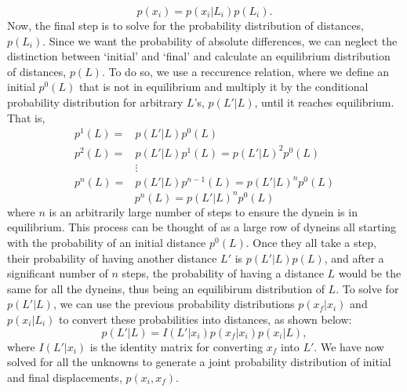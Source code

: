 \begin{equation}
	p(x_i)=p(x_i|L_i)p(L_i).
\end{equation}
Now, the final step is to solve for the probability distribution of distances, $p(L_i)$. Since we want the probability of absolute differences, we can neglect the distinction between `initial' and `final' and calculate an equilibrium distribution of distances, $p(L)$. To do so, we use a reccurence relation, where we define an initial $p^0(L)$ that is not in equilibrium and multiply it by the conditional probability distribution for arbitrary $L$'s, $p(L'|L)$, until it reaches equilibrium. That is,
\begin{align*}
	p^1(L)= & p(L'|L)p^0(L) \\
	p^2(L)= & p(L'|L)p^1(L)=p(L'|L)^2p^0(L)\\
	&\vdots \\
	p^n(L)= & p(L'|L)p^{n-1}(L)=p(L'|L)^np^0(L) 
\end{align*}
\begin{equation}
	p^n(L)=p(L'|L)^np^0(L) 	
\end{equation}
where $n$ is an arbitrarily large number of steps to ensure the dynein is in equilibrium. This process can be thought of as a large row of dyneins all starting with the probability of an initial distance $p^0(L)$. Once they all take a step, their probability of having another distance $L'$ is $p(L'|L)p(L)$, and after a significant number of $n$ steps, the probability of having a distance $L$ would be the same for all the dyneins, thus being an equilibirum distribution of $L$. To solve for $p(L'|L)$, we can use the previous probability distributions $p(x_f|x_i)$ and $p(x_i|L_i)$ to convert these probabilities into distances, as shown below:
\begin{equation}
	p(L'|L)=I(L'|x_i)p(x_f|x_i)p(x_i|L),
\end{equation}
where $I(L'|x_i)$ is the identity matrix for converting $x_f$ into $L'$. We have now solved for all the unknowns to generate a joint probability distribution of initial and final displacements, $p(x_i,x_f)$. 


